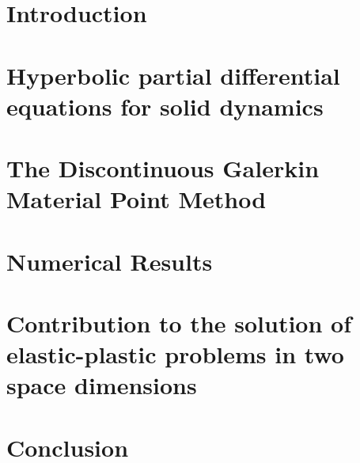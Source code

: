 \documentclass[10pt,a4paper,twoside]{report}
\begin{document}


\tableofcontents{}


\chapter{Introduction}



\chapter{Hyperbolic partial differential equations for solid dynamics}
\label{chap:chap2}


\chapter{The Discontinuous Galerkin Material Point Method}
\label{chap:chap3}


\chapter{Numerical Results}
\label{chap:chap4}


\chapter{Contribution to the solution of elastic-plastic problems in two space dimensions}
\label{chap:chap5}



\chapter{Conclusion}








\end{document}

